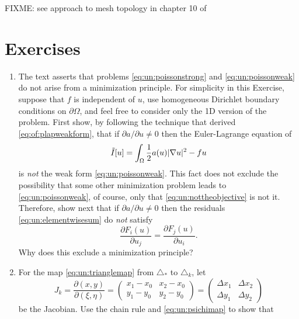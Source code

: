 FIXME: see approach to mesh topology in chapter 10 of \citep{Loggetal2012}


\section{Exercises}

\renewcommand{\labelenumi}{\arabic{chapter}.\arabic{enumi}\quad}
\renewcommand{\labelenumii}{(\alph{enumii})}
\begin{enumerate}
\item \label{exer:un:notminimization}  The text asserts that problems \eqref{eq:un:poissonstrong} and \eqref{eq:un:poissonweak} do not arise from a minimization principle.  For simplicity in this Exercise, suppose that $f$ is independent of $u$, use homogeneous Dirichlet boundary conditions on $\partial \Omega$, and feel free to consider only the 1D version of the problem.  First show, by following the technique that derived \eqref{eq:of:plapweakform}, that if $\partial a/\partial u \ne 0$ then the Euler-Lagrange equation of
\begin{equation}
  \tilde I[u] = \int_\Omega \frac{1}{2} a(u) |\nabla u|^2 - f u  \label{eq:un:nottheobjective}
\end{equation}
is \emph{not} the weak form \eqref{eq:un:poissonweak}.  This fact does not exclude the possibility that some other minimization problem leads to \eqref{eq:un:poissonweak}, of course, only that \eqref{eq:un:nottheobjective} is not it.  Therefore, show next that if $\partial a/\partial u \ne 0$ then the residuals \eqref{eq:un:elementwisesum} do \emph{not} satisfy
\begin{equation}
  \frac{\partial F_i(u)}{\partial u_j} = \frac{\partial F_j(u)}{\partial u_i}.  \label{eq:un:symmetryresidualsdonthave}
\end{equation}
Why does this exclude a minimization principle?
\item  \label{exer:un:gradientdetails}  For the map \eqref{eq:un:trianglemap} from $\triangle_\ast$ to $\triangle_k$, let
    $$J_k = \frac{\partial (x,y)}{\partial (\xi,\eta)} = \begin{pmatrix}
    x_1 - x_0 & x_2 - x_0 \\
    y_1 - y_0 & y_2 - y_0 \end{pmatrix}
    = \begin{pmatrix}
    \Delta x_1 & \Delta x_2 \\
    \Delta y_1 & \Delta y_2
    \end{pmatrix}$$
be the Jacobian.  Use the chain rule and \eqref{eq:un:psichimap} to show that

\end{enumerate}
